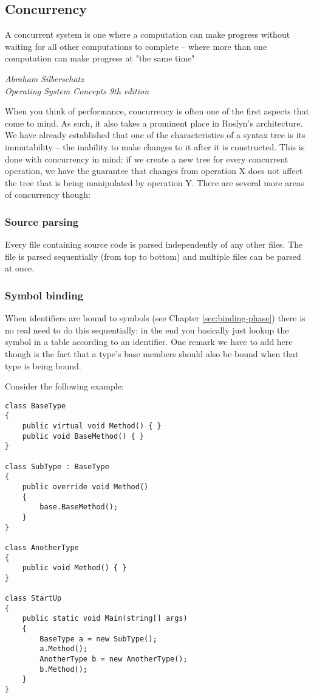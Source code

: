 \subsection{Concurrency}
\label{sec:concurrency}

\epigraph{A concurrent system is one where a computation can make progress without waiting for all other computations to complete -- where more than one computation can make progress at "the same time"}{\textit{Abraham Silberschatz \\ \footnotesize{Operating System Concepts 9th edition}}}

When you think of performance, concurrency is often one of the first aspects that come to mind. As such, it also takes a prominent place in Roslyn's architecture. We have already established that one of the characteristics of a syntax tree is its immutability -- the inability to make changes to it after it is constructed. This is done with concurrency in mind: if we create a new tree for every concurrent operation, we have the guarantee that changes from operation X does not affect the tree that is being manipulated by operation Y. There are several more areas of concurrency though:

\subsubsection{Source parsing}
\label{sec:concur-source-parsing}

Every file containing source code is parsed independently of any other files. The file is parsed sequentially (from top to bottom) and multiple files can be parsed at once.\parencite{Sadov2014}

\subsubsection{Symbol binding }
\label{sec:concur-symbol-binding}

When identifiers are bound to symbols (see Chapter \ref{sec:binding-phase}) there is no real need to do this sequentially: in the end you basically just lookup the symbol in a table according to an identifier. One remark we have to add here though is the fact that a type's base members should also be bound when that type is being bound.

Consider the following example:

\begin{lstlisting}
class BaseType
{
	public virtual void Method() { }
	public void BaseMethod() { }	
}

class SubType : BaseType
{
	public override void Method()
	{
		base.BaseMethod();
	}
}

class AnotherType
{
	public void Method() { }
}

class StartUp 
{
	public static void Main(string[] args)
	{
		BaseType a = new SubType();
		a.Method();
		AnotherType b = new AnotherType();
		b.Method();
	}
}
\end{lstlisting}

